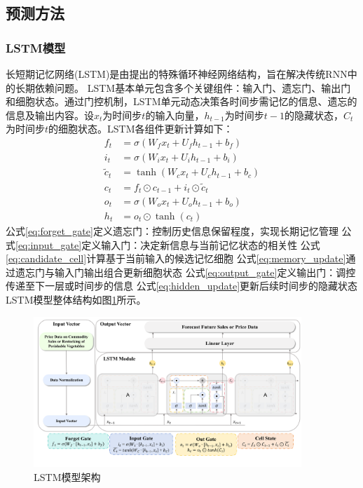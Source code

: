 \documentclass[lang=cn,12pt,a4paper]{elegantpaper}
\begin{document}
\subsection{预测方法}
\label{subsec:forecasting_method}

\subsubsection{LSTM模型}
\label{subsubsec:lstm_model}
长短期记忆网络(LSTM)是由\citet{Hochreiter1997}提出的特殊循环神经网络结构，旨在解决传统RNN中的长期依赖问题。  
LSTM基本单元包含多个关键组件：输入门、遗忘门、输出门和细胞状态\citep{Hochreiter1997}。通过门控机制，LSTM单元动态决策各时间步需记忆的信息、遗忘的信息及输出内容\citep{Hochreiter1997}。设$x_t$为时间步$t$的输入向量，$h_{t-1}$为时间步$t-1$的隐藏状态，$C_t$为时间步$t$的细胞状态。LSTM各组件更新计算如下：
\begin{align}  
f_t &= \sigma(W_f x_t + U_f h_{t-1} + b_f) \label{eq:forget_gate}\\  
i_t &= \sigma(W_i x_t + U_i h_{t-1} + b_i) \label{eq:input_gate}\\  
\tilde{c}_t &= \tanh(W_c x_t + U_c h_{t-1} + b_c) \label{eq:candidate_cell}\\  
c_t &= f_t \odot c_{t-1} + i_t \odot \tilde{c}_t \label{eq:memory_update}\\  
o_t &= \sigma(W_o x_t + U_o h_{t-1} + b_o) \label{eq:output_gate}\\  
h_t &= o_t \odot \tanh(c_t) \label{eq:hidden_update}  
\end{align}
公式\eqref{eq:forget_gate}定义遗忘门：控制历史信息保留程度，实现长期记忆管理  
公式\eqref{eq:input_gate}定义输入门：决定新信息与当前记忆状态的相关性  
公式\eqref{eq:candidate_cell}计算基于当前输入的候选记忆细胞  
公式\eqref{eq:memory_update}通过遗忘门与输入门输出组合更新细胞状态  
公式\eqref{eq:output_gate}定义输出门：调控传递至下一层或时间步的信息  
公式\eqref{eq:hidden_update}更新后续时间步的隐藏状态  
LSTM模型整体结构如图\ref{fig:fig2}所示。

\begin{figure}[H]
        \centering
        \includegraphics[width=0.9\textwidth]{图片2.png}
        \caption{LSTM模型架构}
        \label{fig:fig2}
\end{figure}
\end{document}
